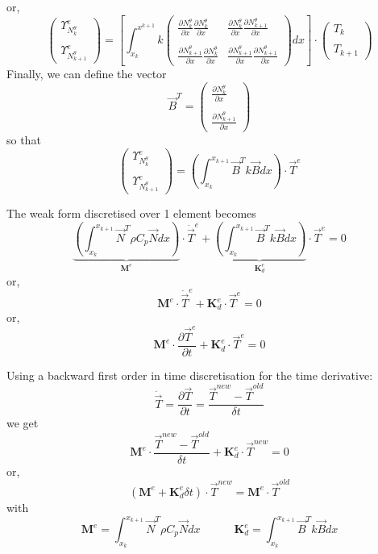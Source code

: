 or,
\[
\left(
\begin{array}{cc}
 {\Upsilon}_{N_k^\theta}^e \\ \\ {\Upsilon}_{N_{k+1}^\theta}^e
\end{array}
\right)
=
\left[
\int_{x_k}^{x^{k+1}}
k
\left(
\begin{array}{cc}
\frac{\partial N_k^\theta}{\partial x}  \frac{\partial  N_{k}^\theta } {\partial x}   & 
\frac{\partial N_k^\theta}{\partial x}  \frac{\partial  N_{k+1}^\theta } {\partial x}  
\\ \\
\frac{\partial N_{k+1}^\theta}{\partial x}  \frac{\partial  N_{k}^\theta } {\partial x}   & 
\frac{\partial N_{k+1}^\theta}{\partial x}  \frac{\partial  N_{k+1}^\theta } {\partial x}  
\end{array}
\right)
dx
\right]
\cdot
\left(
\begin{array}{c}
T_k \\ \\ T_{k+1}
\end{array}
\right)
\]
Finally, we can define the vector 
\[
{\vec B}^T=
\left(
\begin{array}{cc}
 \frac{\partial N_k^\theta}{\partial x}   \\ \\
 \frac{\partial N_{k+1}^\theta}{\partial x}
\end{array}
\right)
\]
so that 
\[
\left(
\begin{array}{cc}
 {\Upsilon}_{N_k^\theta}^e \\ \\ {\Upsilon}_{N_{k+1}^\theta}^e
\end{array}
\right)
=
\left( \int_{x_k}^{x_{k+1}}   {\vec B}^T k {\vec B} dx  \right) \cdot {\vec T}^e
\]

The weak form discretised over 1 element becomes
\[
\underbrace{\left( \int_{x_k}^{x_{k+1}}   {\vec N}^T \rho C_p {\vec N} dx  \right) }_{\bm M^e} \cdot \dot{\vec T}^e
+
\underbrace{\left( \int_{x_k}^{x_{k+1}}   {\vec B}^T k {\vec B} dx  \right)}_{{\bm K}_d^e} \cdot {\vec T}^e
=0
\]
or,
\[
\boxed{
{\bm M}^e \cdot \dot{\vec T}^e + {\bm K}_d^e \cdot {\vec T}^e = 0
}
\]
or,
\[
\boxed{
{\bm M}^e \cdot \frac{\partial {\vec T}^e}{\partial t} + {\bm K}_d^e \cdot {\vec T}^e = 0
}
\]

Using a backward first order in time discretisation for the time derivative:
\[
\dot{\vec T}= \frac{\partial {\vec T}}{\partial t} = \frac{{\vec T}^{new}-{\vec T}^{old}}{\delta t}
\]
we get
\[
{\bm M}^e \cdot \frac{{\vec T}^{new}-{\vec T}^{old}}{\delta t} + {\bm K}_d^e \cdot {\vec T}^{new} = 0
\]
or, 
\[
\boxed{
( {\bm M}^e +  {\bm K}_d^e  \delta t ) \cdot {\vec T}^{new} =  {\bm M}^e \cdot  {\vec T}^{old}
}
\]
with 
\[
{\bm M}^e=  \int_{x_k}^{x_{k+1}}   {\vec N}^T \rho C_p {\vec N} dx  
\quad\quad\quad
{\bm K}_d^e =
 \int_{x_k}^{x_{k+1}}   {\vec B}^T k {\vec B} dx 
\]


